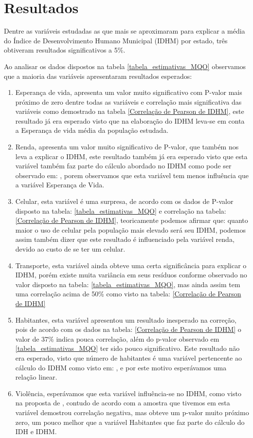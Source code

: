 \documentclass[journal]{IEEEtran}
\begin{document}
\section{Resultados}

Dentre as variáveis estudadas as que mais se aproximaram para explicar a média do Índice de Desenvolvimento Humano Municipal (IDHM) por estado, três obtiveram resultados significativos a 5\%.

Ao analisar os dados dispostos na tabela \ref{tabela_estimativas_MQO} observamos que a maioria das variáveis apresentaram resultados esperados:

\begin{enumerate}
\item {Esperança de vida, apresenta um valor muito significativo com P-valor mais próximo de zero dentre todas as variáveis e correlação mais significativa das variáveis como demostrado na tabela \ref{Correlação de Pearson de IDHM}, este resultado já era esperado visto que na elaboração do IDHM leva-se em conta a Esperança de vida média da população estudada.}
\item {Renda, apresenta um valor muito significativo de P-valor, que também nos leva a explicar o IDHM, este resultado também já era esperado visto que esta variável também faz parte do cálculo abordado no IDHM como pode ser observado em: \cite{Liana2015}\cite{Luciana2007}, porem observamos que esta variável tem menos influência que a variável Esperança de Vida.}
\item {Celular, esta variável é uma surpresa, de acordo com os dados de P-valor disposto na tabela: \ref{tabela_estimativas_MQO} e correlação na tabela: \ref{Correlação de Pearson de IDHM}, teoricamente podemos afirmar que: quanto maior o uso de celular pela população mais elevado será seu IDHM, podemos assim também dizer que este resultado é influenciado pela variável renda, devido ao custo de se ter um celular.}
\item {Transporte, esta variável ainda obteve uma certa significância para explicar o IDHM, porém existe muita variância em seus resíduos conforme observado no valor disposto na tabela: \ref{tabela_estimativas_MQO}, mas ainda assim tem uma correlação acima de 50\% como visto na tabela: \ref{Correlação de Pearson de IDHM}}
\item {Habitantes, esta variável apresentou um resultado inesperado na correção, pois de acordo com os dados na tabela: \ref{Correlação de Pearson de IDHM} o valor de 37\% indica pouca correlação, além do p-valor observado em \ref{tabela_estimativas_MQO} ter sido pouco significativo. Este resultado não era esperado, visto que número de habitantes é uma variável pertencente ao cálculo do IDHM como visto em: \cite{Liana2015}\cite{Luciana2007}\cite{Ferreira2015}, e por este motivo esperávamos uma relação linear.}
\item {Violência, esperávamos que esta variável influência-se no IDHM, como visto na proposta de \cite{Cruz2016}, contudo de acordo com a amostra que tivemos em \cite{Atlas2017} esta variável demostrou correlação negativa, mas obteve um p-valor muito próximo zero, um pouco melhor que a variável Habitantes que faz parte do cálculo do IDH e IDHM\cite{Luciana2007}.}
\end{enumerate}
\end{document}
